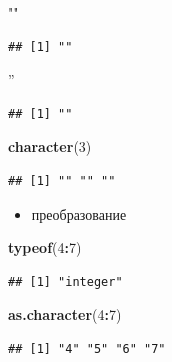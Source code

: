 \documentclass[
]{book}
\newenvironment{Shaded}{\begin{snugshade}}{\end{snugshade}}
\newcommand{\DecValTok}[1]{\textcolor[rgb]{0.00,0.00,0.81}{#1}}
\newcommand{\KeywordTok}[1]{\textcolor[rgb]{0.13,0.29,0.53}{\textbf{#1}}}
\newcommand{\NormalTok}[1]{#1}
\newcommand{\OperatorTok}[1]{\textcolor[rgb]{0.81,0.36,0.00}{\textbf{#1}}}
\newcommand{\StringTok}[1]{\textcolor[rgb]{0.31,0.60,0.02}{#1}}
\providecommand{\tightlist}{%
  \setlength{\itemsep}{0pt}\setlength{\parskip}{0pt}}
\begin{document}
\begin{Shaded}
\begin{Highlighting}[]
\StringTok{""}
\end{Highlighting}
\end{Shaded}

\begin{verbatim}
## [1] ""
\end{verbatim}

\begin{Shaded}
\begin{Highlighting}[]
\StringTok{''}
\end{Highlighting}
\end{Shaded}

\begin{verbatim}
## [1] ""
\end{verbatim}

\begin{Shaded}
\begin{Highlighting}[]
\KeywordTok{character}\NormalTok{(}\DecValTok{3}\NormalTok{)}
\end{Highlighting}
\end{Shaded}

\begin{verbatim}
## [1] "" "" ""
\end{verbatim}

\begin{itemize}
\tightlist
\item
  преобразование
\end{itemize}

\begin{Shaded}
\begin{Highlighting}[]
\KeywordTok{typeof}\NormalTok{(}\DecValTok{4}\OperatorTok{:}\DecValTok{7}\NormalTok{)}
\end{Highlighting}
\end{Shaded}

\begin{verbatim}
## [1] "integer"
\end{verbatim}

\begin{Shaded}
\begin{Highlighting}[]
\KeywordTok{as.character}\NormalTok{(}\DecValTok{4}\OperatorTok{:}\DecValTok{7}\NormalTok{)}
\end{Highlighting}
\end{Shaded}

\begin{verbatim}
## [1] "4" "5" "6" "7"
\end{verbatim}
\end{document}
